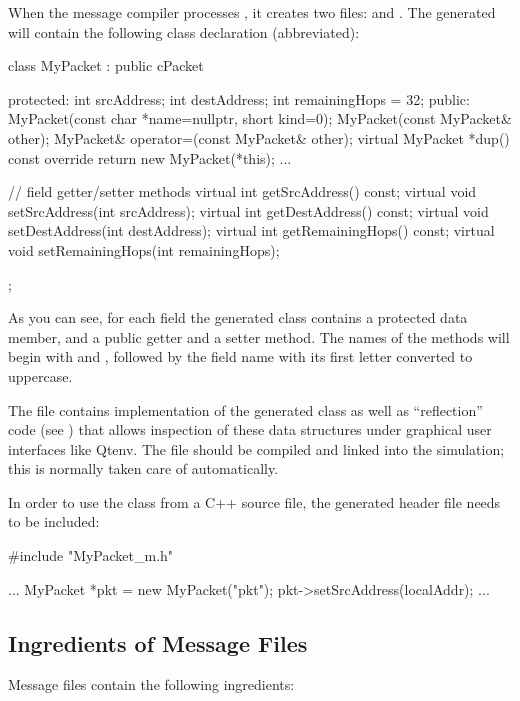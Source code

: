 When the message compiler processes , it creates two files:
 and . The generated 
will contain the following class declaration (abbreviated):

\begin{cpp}
class MyPacket : public cPacket {
  protected:
    int srcAddress;
    int destAddress;
    int remainingHops = 32;
  public:
    MyPacket(const char *name=nullptr, short kind=0);
    MyPacket(const MyPacket& other);
    MyPacket& operator=(const MyPacket& other);
    virtual MyPacket *dup() const override {return new MyPacket(*this);}
    ...

    // field getter/setter methods
    virtual int getSrcAddress() const;
    virtual void setSrcAddress(int srcAddress);
    virtual int getDestAddress() const;
    virtual void setDestAddress(int destAddress);
    virtual int getRemainingHops() const;
    virtual void setRemainingHops(int remainingHops);
};
\end{cpp}

As you can see, for each field the generated class contains a protected data
member, and a public getter and a setter method. The names of the methods will
begin with  and , followed by the field name with its first
letter converted to uppercase.

The  file contains implementation of the generated
 class as well as ``reflection'' code (see
) that allows inspection of these data structures under
graphical user interfaces like Qtenv. The  file should be
compiled and linked into the simulation; this is normally taken care of
automatically.

In order to use the  class from a C++ source file, the
generated header file needs to be included:

\begin{cpp}
#include "MyPacket_m.h"

...
MyPacket *pkt = new MyPacket("pkt");
pkt->setSrcAddress(localAddr);
...
\end{cpp}


\subsection{Ingredients of Message Files}
\label{sec:msg-defs:ingredients}

Message files contain the following ingredients:

